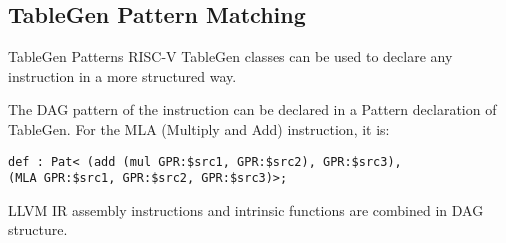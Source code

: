\subsection{TableGen Pattern Matching}
\begin{frame}[fragile]{TableGen Patterns}
    RISC-V TableGen classes can be used to declare any instruction in a more structured way.
    \par
    The DAG pattern of the instruction can be declared in a Pattern declaration of TableGen. For the MLA (Multiply and Add) instruction, it is:

\begin{lstlisting}
def : Pat< (add (mul GPR:$src1, GPR:$src2), GPR:$src3),
(MLA GPR:$src1, GPR:$src2, GPR:$src3)>;
\end{lstlisting}
LLVM IR assembly instructions and intrinsic functions are combined in DAG structure. 
\end{frame}
